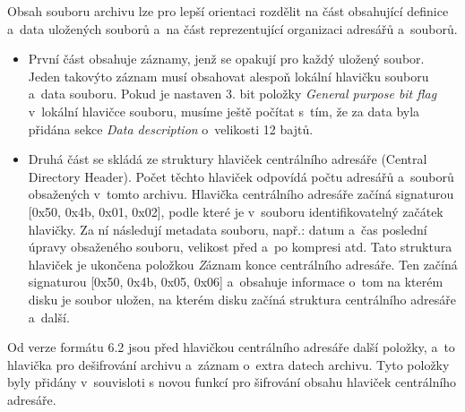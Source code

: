  Obsah souboru archivu lze pro lepší orientaci rozdělit na část obsahující definice a~data
uložených souborů a~na část reprezentující organizaci adresářů a~souborů.
\begin{itemize}
    \item První část obsahuje záznamy, jenž se opakují pro každý uložený soubor. Jeden takovýto
záznam musí obsahovat alespoň lokální hlavičku souboru a~data souboru. Pokud je nastaven
3. bit položky {\it General purpose bit flag} v~lokální hlavičce souboru, musíme ještě počítat
s~tím, že za data byla přidána sekce {\it Data description} o~velikosti 12 bajtů.
    \item Druhá část se skládá ze struktury hlaviček centrálního adresáře (Central Directory
	Header). Počet těchto hlaviček odpovídá počtu adresářů a~souborů obsažených v~tomto
	archivu. Hlavička centrálního adresáře začíná signaturou [0x50, 0x4b, 0x01, 0x02], podle které je
	v~souboru identifikovatelný začátek hlavičky. Za ní následují metadata souboru, např.: datum a~čas
	poslední úpravy obsaženého souboru, velikost před a~po kompresi atd. Tato struktura hlaviček je
	ukončena položkou {\textit Záznam konce centrálního adresáře}. Ten začíná signaturou [0x50, 0x4b, 0x05, 0x06]
	a~obsahuje informace o~tom na kterém disku je soubor uložen, na kterém disku začíná struktura
	centrálního adresáře a~další.
\end{itemize}
Od verze formátu 6.2 jsou před hlavičkou centrálního adresáře další položky, a~to hlavička
pro dešifrování archivu a~záznam o~extra datech archivu. Tyto položky byly přidány
v~souvisloti s novou funkcí pro šifrování obsahu hlaviček centrálního adresáře.

